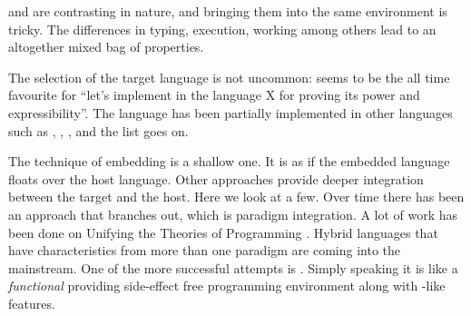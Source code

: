 \documentclass[thesis-solanki.tex]{subfiles}
\begin{document}
 and  are contrasting in nature, and
bringing them into the same environment is tricky.
The differences in typing, execution, working among others lead to an altogether mixed bag of properties.


The selection of the target language is not uncommon:
 seems to be the all time favourite for ``let's implement  in the language X for
proving its power and expressibility''.
The  language has been partially implemented \cite{swipembedd} in other 
languages such as  \cite{racklog},   
\cite{komorowski1982qlog,robinson1982loglisp,robinson1980loglisp},  \cite{wikiprolog, jlog}, 
 \cite{jscriptlog} and the list \cite{yieldprolog} goes on.

The technique of embedding is a shallow one.
It is as if the embedded language floats over the host language.
Other approaches provide deeper integration between the target and the host.
Here we look at a few.
Over time there has been an approach that branches out, which is paradigm integration.
A lot of work has been done on Unifying the Theories of Programming
\cite{DBLP:conf/utp/2006,DBLP:conf/utp/2008,DBLP:conf/utp/2010,DBLP:conf/utp/2012,hoare1998unifying,
  gibbons2013unifying}.
Hybrid languages that have characteristics from more than one paradigm are coming into the
mainstream.
One of the more successful attempts is  \cite{website:scala}. Simply speaking it is like a \textit{functional} 
 providing side-effect free programming environment along with
-like features.
\end{document}
